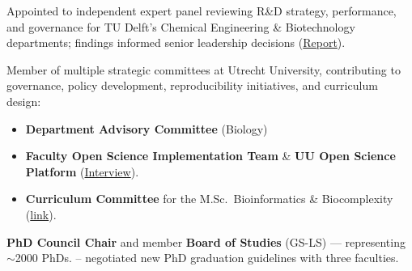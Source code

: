 \documentclass[a4paper,10pt]{article}
\begin{document}
{\begin{adjustbox}{valign=t}
\begin{minipage}[t]{0.6\textwidth}
\begin{description}
\raggedright
\item[\normalfont \textcolor{ForestGreen}{\textbf{2021 -- 2022.}}] Appointed to independent expert panel reviewing R\&D strategy, performance, and governance 
  for TU Delft’s Chemical Engineering \& Biotechnology departments; findings informed senior leadership decisions 
  (\href{https://filelist.tudelft.nl/TUDelft/Onderzoek/Kwaliteitsborging/Final report SEP Chemistry TU Delft 20220204.pdf}{Report}).
\item[\normalfont \textcolor{ForestGreen}{\textbf{2019 -- now.}}] Member of multiple strategic committees at Utrecht University, 
contributing to governance, policy development, reproducibility initiatives, and curriculum design:
  \begin{itemize}
    \item \textbf{Department Advisory Committee} (Biology) %
    \item \textbf{Faculty Open Science Implementation Team} \& \textbf{UU Open Science Platform} %
      (\href{https://www.uu.nl/en/news/meet-laura-dijkhuizen}{Interview}).
    \item \textbf{Curriculum Committee} for the M.Sc.\ Bioinformatics \& Biocomplexity %
    (\href{https://www.uu.nl/en/masters/bioinformatics-and-biocomplexity}{link}).
  \end{itemize}
  \item[\normalfont \textcolor{ForestGreen}{\textbf{2017 -- 2021.}}] \textbf{PhD Council Chair} 
    and member \textbf{Board of Studies} (GS-LS) — representing $\sim$2000 PhDs.
    -- negotiated new PhD graduation guidelines with three faculties.
\end{description}



\end{minipage}
\end{adjustbox}}
\end{document}
